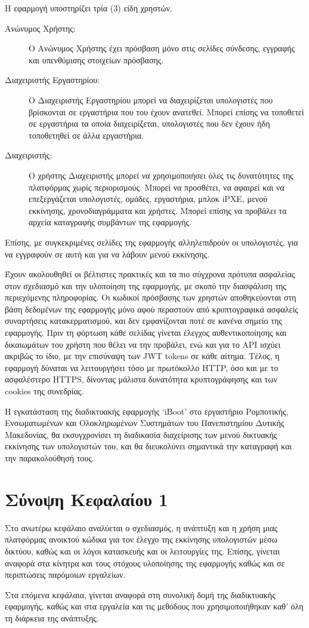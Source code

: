 Η εφαρμογή υποστηρίζει τρία (3) είδη χρηστών.
\begin{description}
	\item[Ανώνυμος Χρήστης:] Ο Ανώνυμος Χρήστης έχει πρόσβαση μόνο στις σελίδες σύνδεσης, εγγραφής και υπενθύμισης στοιχείων πρόσβασης.
	\item[Διαχειριστής Εργαστηρίου:] Ο Διαχειριστής Εργαστηρίου μπορεί να διαχειρίζεται υπολογιστές που βρίσκονται σε εργαστήρια που του έχουν ανατεθεί. Μπορεί επίσης να τοποθετεί σε εργαστήρια τα οποία διαχειρίζεται, υπολογιστές που δεν έχουν ήδη τοποθετηθεί σε άλλα εργαστήρια.
	\item[Διαχειριστής: ] Ο χρήστης Διαχειριστής μπορεί να χρησιμοποιήσει όλες τις δυνατότητες της πλατφόρμας χωρίς περιορισμούς. Μπορεί να προσθέτει, να αφαιρεί και να επεξεργάζεται υπολογιστές, ομάδες, εργαστήρια, μπλοκ iPXE, μενού εκκίνησης, χρονοδιαγράμματα και χρήστες. Μπορεί επίσης να προβάλει τα αρχεία καταγραφής συμβάντων της εφαρμογής.
\end{description}
Επίσης, με συγκεκριμένες σελίδες της εφαρμογής αλληλεπιδρούν οι υπολογιστές, για να εγγραφούν σε αυτή και για να λάβουν μενού εκκίνησης.

Έχουν ακολουθηθεί οι βέλτιστες πρακτικές και τα πιο σύγχρονα πρότυπα ασφαλείας στον σχεδιασμό και την υλοποίηση της εφαρμογής, με σκοπό την διασφάλιση της περιεχόμενης πληροφορίας. Οι κωδικοί πρόσβασης των χρηστών αποθηκεύονται στη βάση δεδομένων της εφαρμογής μόνο αφού περαστούν από κρυπτογραφικά ασφαλείς συναρτήσεις κατακερματισμού, και δεν εμφανίζονται ποτέ σε κανένα σημείο της εφαρμογής. Πριν τη φόρτωση κάθε σελίδας γίνεται έλεγχος αυθεντικοποίησης και δικαιωμάτων του χρήστη που θέλει να την προβάλει, ενώ και για το API ισχύει ακριβώς το ίδιο, με την επισύναψη των JWT tokens σε κάθε αίτημα. Τέλος, η εφαρμογή δύναται να λειτουργήσει τόσο με πρωτόκολλο HTTP, όσο και με το ασφαλέστερο HTTPS, δίνοντας μάλιστα δυνατότητα κρυπτογράφησης και των cookies της συνεδρίας.

Η εγκατάσταση της διαδικτυακής εφαρμογής `iBoot' στο εργαστήριο Ρομποτικής, Ενσωματωμένων και Ολοκληρωμένων Συστημάτων του Πανεπιστημίου Δυτικής Μακεδονίας, θα εκσυγχρονίσει τη διαδικασία διαχείρισης των μενού δικτυακής εκκίνησης των υπολογιστών του, και θα διευκολύνει σημαντικά την καταγραφή και την παρακολούθησή τους.

\section{Σύνοψη Κεφαλαίου 1}
Στο ανωτέρω κεφάλαιο αναλύεται ο σχεδιασμός, η ανάπτυξη και η χρήση μιας πλατφόρμας ανοικτού κώδικα για τον έλεγχο της εκκίνησης υπολογιστών μέσω δικτύου, καθώς και οι λόγοι κατασκευής και οι λειτουργίες της. Επίσης, γίνεται αναφορά στα κίνητρα και τους στόχους υλοποίησης της εφαρμογής καθώς και σε περιπτώσεις παρόμοιων εργαλείων.

Στα επόμενα κεφάλαια, γίνεται αναφορά στη συνολική δομή της διαδικτυακής εφαρμογής, καθώς και στα εργαλεία και τις μεθόδους που χρησιμοποιήθηκαν καθ' όλη τη διάρκεια της ανάπτυξης.

